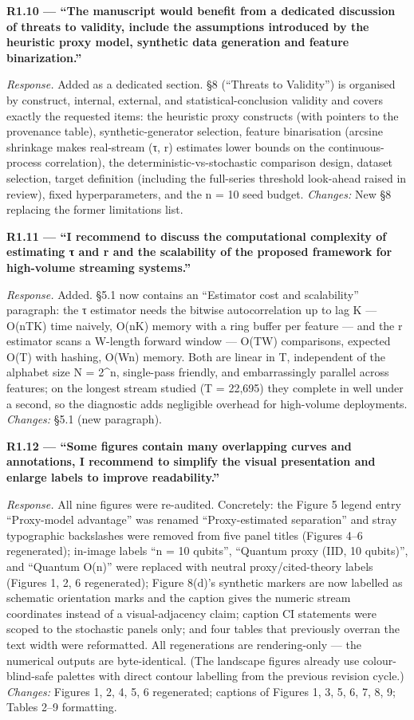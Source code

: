 \documentclass[
  11pt,
]{article}
\begin{document}
\textbf{R1.10 --- ``The manuscript would benefit from a dedicated
discussion of threats to validity, include the assumptions introduced by
the heuristic proxy model, synthetic data generation and feature
binarization.''}

\emph{Response.} Added as a dedicated section. §8 (``Threats to
Validity'') is organised by construct, internal, external, and
statistical-conclusion validity and covers exactly the requested items:
the heuristic proxy constructs (with pointers to the provenance table),
synthetic-generator selection, feature binarisation (arcsine shrinkage
makes real-stream (τ, r) estimates lower bounds on the
continuous-process correlation), the deterministic-vs-stochastic
comparison design, dataset selection, target definition (including the
full-series threshold look-ahead raised in review), fixed
hyperparameters, and the n = 10 seed budget. \emph{Changes:} New §8
replacing the former limitations list.

\textbf{R1.11 --- ``I recommend to discuss the computational complexity
of estimating τ and r and the scalability of the proposed framework for
high-volume streaming systems.''}

\emph{Response.} Added. §5.1 now contains an ``Estimator cost and
scalability'' paragraph: the τ estimator needs the bitwise
autocorrelation up to lag K --- O(nTK) time naively, O(nK) memory with a
ring buffer per feature --- and the r estimator scans a W-length forward
window --- O(TW) comparisons, expected O(T) with hashing, O(Wn) memory.
Both are linear in T, independent of the alphabet size N = 2\^{}n,
single-pass friendly, and embarrassingly parallel across features; on
the longest stream studied (T = 22,695) they complete in well under a
second, so the diagnostic adds negligible overhead for high-volume
deployments. \emph{Changes:} §5.1 (new paragraph).

\textbf{R1.12 --- ``Some figures contain many overlapping curves and
annotations, I recommend to simplify the visual presentation and enlarge
labels to improve readability.''}

\emph{Response.} All nine figures were re-audited. Concretely: the
Figure 5 legend entry ``Proxy-model advantage'' was renamed
``Proxy-estimated separation'' and stray typographic backslashes were
removed from five panel titles (Figures 4--6 regenerated); in-image
labels ``n = 10 qubits'', ``Quantum proxy (IID, 10 qubits)'', and
``Quantum O(n)'' were replaced with neutral proxy/cited-theory labels
(Figures 1, 2, 6 regenerated); Figure 8(d)'s synthetic markers are now
labelled as schematic orientation marks and the caption gives the
numeric stream coordinates instead of a visual-adjacency claim; caption
CI statements were scoped to the stochastic panels only; and four tables
that previously overran the text width were reformatted. All
regenerations are rendering-only --- the numerical outputs are
byte-identical. (The landscape figures already use colour-blind-safe
palettes with direct contour labelling from the previous revision
cycle.) \emph{Changes:} Figures 1, 2, 4, 5, 6 regenerated; captions of
Figures 1, 3, 5, 6, 7, 8, 9; Tables 2--9 formatting.
\end{document}
